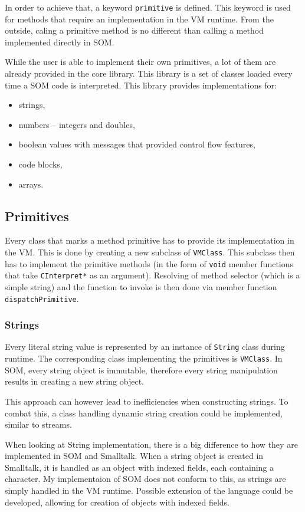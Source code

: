 \documentclass[thesis=M,english]{FITthesis}[2019/12/23]
\begin{document}
In order to achieve that, a keyword \texttt{primitive} is defined. This keyword is used for methods that require an implementation in the VM runtime. From the outside,
caling a primitive method is no different than calling a method implemented directly in SOM.

While the user is able to implement their own primitives, a lot of them are already provided in the core library. This library is a set of classes loaded every time
a SOM code is interpreted. This library provides implementations for:
\begin{itemize}
	\item strings,
	\item numbers -- integers and doubles,
	\item boolean values with messages that provided control flow features,
	\item code blocks,
	\item arrays.
\end{itemize}

\subsection{Primitives}
\label{subsection:primitives}
Every class that marks a method primitive has to provide its implementation in the VM. This is done by creating a new subclass of \texttt{VMClass}. This subclass
then has to implement the primitive methods (in the form of \texttt{void} member functions that take \texttt{CInterpret*} as an argument). Resolving of method
selector (which is a simple string) and the function to invoke is then done via member function \texttt{dispatchPrimitive}.

\subsubsection{Strings}
Every literal string value is represented by an instance of \texttt{String} class during runtime. The corresponding class implementing the primitives is
\texttt{VMClass}. In SOM, every string object is immutable, therefore every string manipulation results in creating a new string object.

This approach can however lead to inefficiencies when constructing strings. To combat this, a class handling dynamic string creation could
be implemented, similar to streams.

When looking at String implementation, there is a big difference to how they are implemented in SOM and Smalltalk. When a string object
is created in Smalltalk, it is handled as an object with indexed fields, each containing a character. My implementaion of SOM does not
conform to this, as strings are simply handled in the VM runtime. Possible extension of the language could be developed, allowing for
creation of objects with indexed fields.
\end{document}
